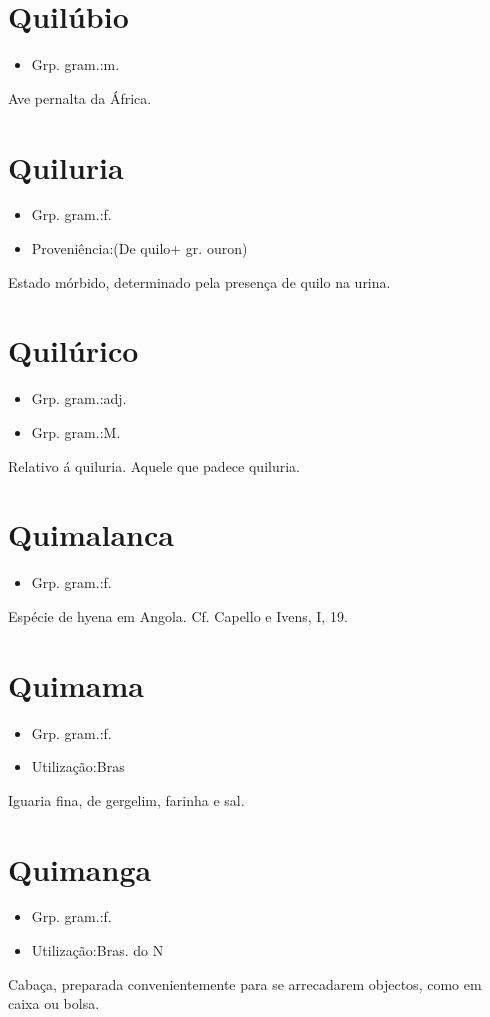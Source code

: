\section{Quilúbio}
\begin{itemize}
\item {Grp. gram.:m.}
\end{itemize}
Ave pernalta da África.
\section{Quiluria}
\begin{itemize}
\item {Grp. gram.:f.}
\end{itemize}
\begin{itemize}
\item {Proveniência:(De \textunderscore quilo\textunderscore  + gr. \textunderscore ouron\textunderscore )}
\end{itemize}
Estado mórbido, determinado pela presença de quilo na urina.
\section{Quilúrico}
\begin{itemize}
\item {Grp. gram.:adj.}
\end{itemize}
\begin{itemize}
\item {Grp. gram.:M.}
\end{itemize}
Relativo á quiluria.
Aquele que padece quiluria.
\section{Quimalanca}
\begin{itemize}
\item {Grp. gram.:f.}
\end{itemize}
Espécie de hyena em Angola. Cf. Capello e Ivens, I, 19.
\section{Quimama}
\begin{itemize}
\item {Grp. gram.:f.}
\end{itemize}
\begin{itemize}
\item {Utilização:Bras}
\end{itemize}
Iguaria fina, de gergelim, farinha e sal.
\section{Quimanga}
\begin{itemize}
\item {Grp. gram.:f.}
\end{itemize}
\begin{itemize}
\item {Utilização:Bras. do N}
\end{itemize}
Cabaça, preparada convenientemente para se arrecadarem objectos, como em caixa ou bolsa.
